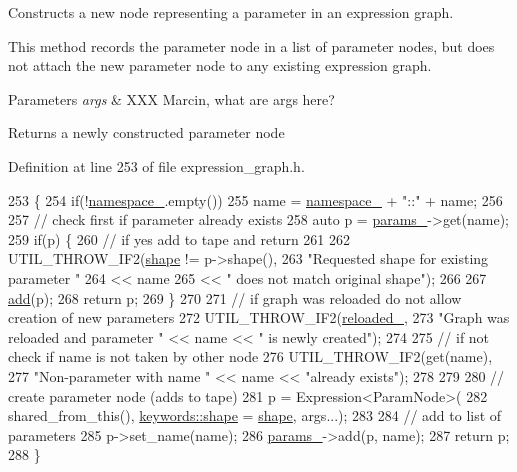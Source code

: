 Constructs a new node representing a parameter in an expression graph. 

This method records the parameter node in a list of parameter nodes, but does not attach the new parameter node to any existing expression graph.


\begin{DoxyParams}{Parameters}
{\em args} & X\+XX Marcin, what are args here?\\
\hline
\end{DoxyParams}
\begin{DoxyReturn}{Returns}
a newly constructed parameter node 
\end{DoxyReturn}


Definition at line 253 of file expression\+\_\+graph.\+h.


\begin{DoxyCode}
253                                                         \{
254     \textcolor{keywordflow}{if}(!\hyperlink{classmarian_1_1ExpressionGraph_a62c31bfad16a2939bced2f37b45dd8d7}{namespace\_}.empty())
255       name = \hyperlink{classmarian_1_1ExpressionGraph_a62c31bfad16a2939bced2f37b45dd8d7}{namespace\_} + \textcolor{stringliteral}{"::"} + name;
256 
257     \textcolor{comment}{// check first if parameter already exists}
258     \textcolor{keyword}{auto} p = \hyperlink{classmarian_1_1ExpressionGraph_a6abcd5dad584fa5abd9b55b75bb5ef87}{params\_}->get(name);
259     \textcolor{keywordflow}{if}(p) \{
260       \textcolor{comment}{// if yes add to tape and return}
261 
262       UTIL\_THROW\_IF2(\hyperlink{namespacemarian_1_1keywords_a5933d683efd12b59e17a7131fa64cf1c}{shape} != p->shape(),
263                      \textcolor{stringliteral}{"Requested shape for existing parameter "}
264                      << name
265                      << \textcolor{stringliteral}{" does not match original shape"});
266 
267       \hyperlink{classmarian_1_1ExpressionGraph_a95bb5e6efbc99952867e46f5db9dc461}{add}(p);
268       \textcolor{keywordflow}{return} p;
269     \}
270 
271     \textcolor{comment}{// if graph was reloaded do not allow creation of new parameters}
272     UTIL\_THROW\_IF2(\hyperlink{classmarian_1_1ExpressionGraph_aa10988c85ca38b3a1ffd72fa42278987}{reloaded\_},
273                    \textcolor{stringliteral}{"Graph was reloaded and parameter "} << name << \textcolor{stringliteral}{" is newly created"});
274 
275     \textcolor{comment}{// if not check if name is not taken by other node}
276     UTIL\_THROW\_IF2(\textcolor{keyword}{get}(name),
277                    \textcolor{stringliteral}{"Non-parameter with name "} << name << \textcolor{stringliteral}{"already exists"});
278 
279 
280     \textcolor{comment}{// create parameter node (adds to tape)}
281     p = Expression<ParamNode>(
282         shared\_from\_this(), \hyperlink{namespacemarian_1_1keywords_a5933d683efd12b59e17a7131fa64cf1c}{keywords::shape} = \hyperlink{namespacemarian_1_1keywords_a5933d683efd12b59e17a7131fa64cf1c}{shape}, args...);
283 
284     \textcolor{comment}{// add to list of parameters}
285     p->set\_name(name);
286     \hyperlink{classmarian_1_1ExpressionGraph_a6abcd5dad584fa5abd9b55b75bb5ef87}{params\_}->add(p, name);
287     \textcolor{keywordflow}{return} p;
288   \}
\end{DoxyCode}


